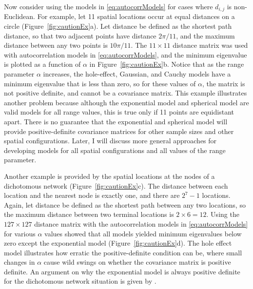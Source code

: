 \documentclass[11pt, titlepage]{article}\usepackage[]{graphicx}\usepackage[]{color}
\begin{document}
\begin{spacing}{1.9}
\begin{flushleft}
Now consider using the models in \ref{eq:autocorrModels} for cases where $d_{i,j}$ is non-Euclidean.  For example, let 11 spatial locations occur at equal distances on a circle (Figure~\ref{fig:cautionEx}a).  Let distance be defined as the shortest path distance, so that two adjacent points have distance $2\pi/11$, and the maximum distance between any two points is $10\pi/11$.  The $11 \times 11$ distance matrix was used with autocorrelation models in \ref{eq:autocorrModels}, and the minimum eigenvalue is plotted as a function of $\alpha$ in Figure~\ref{fig:cautionEx}b.  Notice that as the range parameter $\alpha$ increases, the hole-effect, Gaussian, and Cauchy models have a minimum eigenvalue that is less than zero, so for these values of $\alpha$, the matrix is not positive definite, and cannot be a covariance matrix. This example illustrates another problem because although the exponential model and spherical model are valid models for all range values, this is true only if 11 points are equidistant apart. There is no guarantee that the exponential and spherical model will provide positive-definite covariance matrices for other sample sizes and other spatial configurations.  Later, I will discuss more general approaches for developing models for all spatial configurations and all values of the range parameter.

Another example is provided by the spatial locations at the nodes of a dichotomous network (Figure~\ref{fig:cautionEx}c). The distance between each location and the nearest node is exactly one, and there are $2^7 - 1$ locations.  Again, let distance be defined as the shortest path between any two locations, so the maximum distance between two terminal locations is $2 \times 6 = 12$.  Using the $127 \times 127$ distance matrix with the autocorrelation models in \ref{eq:autocorrModels} for various $\alpha$ values showed that all models yielded minimum eigenvalues below zero except the exponential model (Figure~\ref{fig:cautionEx}d).  The hole effect model illustrates how erratic the positive-definite condition can be, where small changes in $\alpha$ cause wild swings on whether the covariance matrix is positive definite. An argument on why the exponential model is always positive definite for the dichotomous network situation is given by \citet{Ver:Pete:Move:2010}.


\end{flushleft}
\end{spacing}
\end{document}
